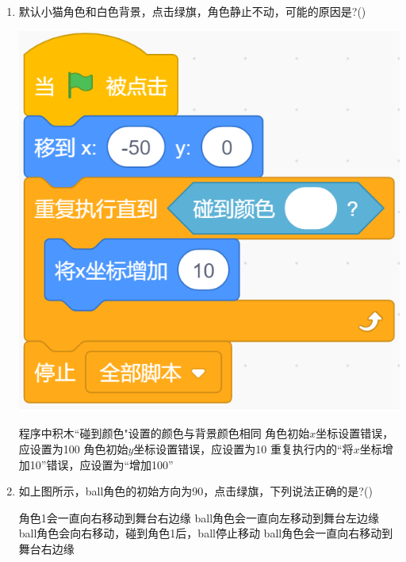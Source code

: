 \documentclass[10pt, a4paper]{article}
\begin{document}
\begin{enumerate}
        \item 默认小猫角色和白色背景，点击绿旗，角色静止不动，可能的原因是?(\qquad)
        
        \begin{minipage}{.18\textwidth}
            \includegraphics[width=\textwidth]{15.png}
        \end{minipage}
        \begin{minipage}{.6\textwidth}
            \begin{tasks}
                \task 程序中积木“碰到颜色"设置的颜色与背景颜色相同
                \task 角色初始$x$坐标设置错误，应设置为100
                \task 角色初始$y$坐标设置错误，应设置为10
                \task 重复执行内的“将$x$坐标增加10”错误，应设置为“增加100”
            \end{tasks}
        \end{minipage}

        \item 如上图所示，ball角色的初始方向为90，点击绿旗，下列说法正确的是?(\qquad)
        \begin{tasks}
            \task 角色1会一直向右移动到舞台右边缘
            \task ball角色会一直向左移动到舞台左边缘
            \task ball角色会向右移动，碰到角色1后，ball停止移动
            \task ball角色会一直向右移动到舞台右边缘
        \end{tasks}


\end{enumerate}
\end{document}
